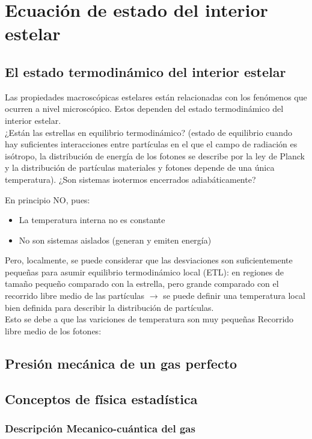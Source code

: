 \setchapterpreamble[u]{\margintoc}
\chapter{Ecuación de estado del interior estelar}

\section{El estado termodinámico del interior estelar}
Las propiedades macroscópicas estelares están relacionadas con los fenómenos que ocurren a nivel microscópico. Estos dependen del estado termodinámico del interior estelar.\\
¿Están las estrellas en equilibrio termodinámico? (estado de equilibrio cuando hay suficientes interacciones entre partículas en el que el campo de radiación es isótropo, la distribución de energía de los fotones se describe por la ley de Planck y la distribución de partículas materiales y fotones depende de una única temperatura). ¿Son sistemas isotermos encerrados adiabáticamente?

En principio NO, pues:
\begin{itemize}
  \item La temperatura interna no es constante
  \item No son sistemas aislados (generan y emiten energía)
\end{itemize}

Pero, localmente, se puede considerar que las desviaciones son suficientemente pequeñas para asumir equilibrio termodinámico local (ETL): en regiones de tamaño pequeño comparado con la estrella, pero grande comparado con el recorrido libre medio de las partículas $\rightarrow$ se puede definir una temperatura local bien definida para describir la distribución de partículas.\\

Esto se debe a que las variciones de temperatura son muy pequeñas 
Recorrido libre medio de los fotones:
\section{Presión mecánica de un gas perfecto}
\section{Conceptos de física estadística}
\subsection{Descripción Mecanico-cuántica del gas}
